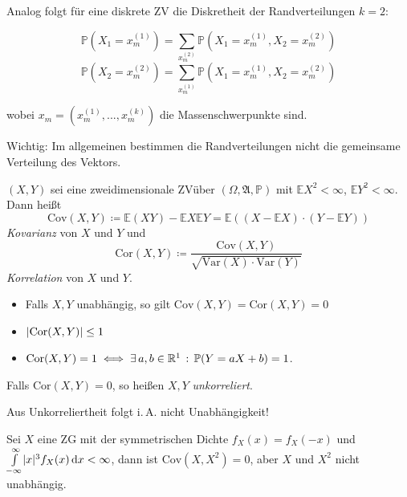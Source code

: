 \documentclass{cheat-sheet}
\newcommand{\Alg}{\mathfrak{A}} %
\renewcommand{\P}{\mathbb{P}} %
\newcommand{\E}{\mathbb{E}} %
\newcommand{\Var}{\mathrm{Var}} %
\newcommand{\cov}{\mathrm{Cov}} %
\newcommand{\cor}{\mathrm{Cor}} %
\begin{document}
Analog folgt für eine diskrete ZV die Diskretheit der Randverteilungen $k=2$:

\[ \P(X_1 = x_m^{(1)}) = \sum_{x_m^{(2)}} \P(X_1 = x_m^{(1)}, X_2 = x_m^{(2)}) \]
\[ \P(X_2 = x_m^{(2)}) = \sum_{x_m^{(1)}} \P(X_1 = x_m^{(1)}, X_2 = x_m^{(2)}) \]

wobei $x_m = (x_m^{(1)}, ..., x_m^{(k)})$ die Massenschwerpunkte sind.

Wichtig: Im allgemeinen bestimmen die Randverteilungen nicht die gemeinsame Verteilung des Vektors.



\begin{defn}
  $(X, Y)$ sei eine zweidimensionale ZVüber $(\Omega, \Alg, \P)$ mit $\E X^2 < \infty$, $\E Y^2 < \infty$. Dann heißt
  \[ \cov(X, Y) \coloneqq \E(XY) - \E X \E Y = \E ((X - \E X) \cdot (Y - \E Y)) \]
  \emph{Kovarianz} von $X$ und $Y$ und
  \[ \cor(X, Y) \coloneqq \frac{\cov(X, Y)}{\sqrt{\Var(X) \cdot \Var(Y)}} \]
  \emph{Korrelation} von $X$ und $Y$.
\end{defn}

\begin{satz}
  \begin{itemize}
    \item Falls $X, Y$ unabhängig, so gilt $\cov(X, Y) = \cor(X, Y) = 0$
    \item $\abs{\cor(X, Y)} \leq 1$
    \item $\cor(X, Y) = 1 \iff \exists \, a, b \in \R^1 \,:\, \P(Y = aX + b) = 1$.
  \end{itemize}
\end{satz}

\begin{defn}
  Falls $\cor(X, Y) = 0$, so heißen $X, Y$ \emph{unkorreliert}.
\end{defn}

\begin{acht}
  Aus Unkorreliertheit folgt i.\,A. nicht Unabhängigkeit!
\end{acht}

\begin{bsp}
  Sei $X$ eine ZG mit der symmetrischen Dichte $f_X(x) = f_X(-x)$ und ${\textstyle \int\limits_{-\infty}^{\infty}} \lvert x\rvert^3 f_X(x) \,\mathrm{d} x < \infty$, dann ist $\cov(X, X^2) = 0$, aber $X$ und $X^2$ nicht unabhängig.
\end{bsp}
\end{document}
